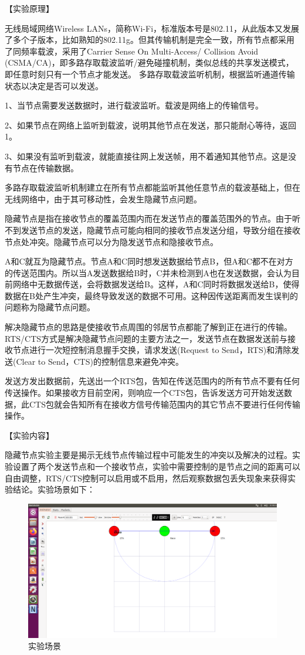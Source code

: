\documentclass[lang=cn,11pt,a4paper,cite=authoryear]{elegantpaper}
\begin{document}
【实验原理】

无线局域网络Wireless LANs，简称Wi-Fi，标准版本号是802.11，从此版本又发展了多个子版本，比如熟知的802.11g。但其传输机制是完全一致，所有节点都采用了同频率载波，采用了Carrier Sense On Multi-Access/ Collision Avoid (CSMA/CA)，即多路存取载波监听/避免碰撞机制，类似总线的共享发送模式，即任意时刻只有一个节点才能发送。
多路存取载波监听机制，根据监听通道传输状态以决定是否可以发送。

1、当节点需要发送数据时，进行载波监听。载波是网络上的传输信号。

2、如果节点在网络上监听到载波，说明其他节点在发送，那只能耐心等待，返回1。

3、如果没有监听到载波，就能直接往网上发送帧，用不着通知其他节点。这是没有节点在传输数据。

多路存取载波监听机制建立在所有节点都能监听其他任意节点的载波基础上，但在无线网络中，由于其可移动性，会发生隐藏节点问题。

隐藏节点是指在接收节点的覆盖范围内而在发送节点的覆盖范围外的节点。由于听不到发送节点的发送，隐藏节点可能向相同的接收节点发送分组，导致分组在接收节点处冲突。隐藏节点可以分为隐发送节点和隐接收节点。

A和C就互为隐藏节点。节点A和C同时想发送数据给节点B，但A和C都不在对方的传送范围内。所以当A发送数据给B时，C并未检测到A也在发送数据，会认为目前网络中无数据传送，会将数据发送给B。这样，A和C同时将数据发送给B，使得数据在B处产生冲突，最终导致发送的数据不可用。这种因传送距离而发生误判的问题称为隐藏节点问题。

解决隐藏节点的思路是使接收节点周围的邻居节点都能了解到正在进行的传输。RTS/CTS方式是解决隐藏节点问题的主要方法之一，发送节点在数据发送前与接收节点进行一次短控制消息握手交换，请求发送(Request to Send，RTS)和清除发送(Clear to Send，CTS)的控制信息来避免冲突。

发送方发出数据前，先送出一个RTS包，告知在传送范围内的所有节点不要有任何传送操作。如果接收方目前空闲，则响应一个CTS包，告诉发送方可开始发送数据，此CTS包就会告知所有在接收方信号传输范围内的其它节点不要进行任何传输操作。

【实验内容】

隐藏节点实验主要是揭示无线节点传输过程中可能发生的冲突以及解决的过程。实验设置了两个发送节点和一个接收节点，实验中需要控制的是节点之间的距离可以自由调整，RTS/CTS控制可以启用或不启用，然后观察数据包丢失现象来获得实验结论。实验场景如下：

\begin{figure}[htbp]
	\centering
	\includegraphics[width=0.7\linewidth]{image/screenshot019}
	\caption{实验场景}
	\label{fig:screenshot019}
\end{figure}
\end{document}
